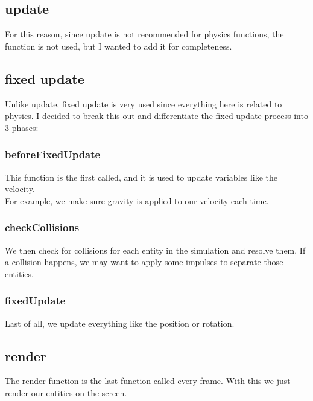 \documentclass{article}
\begin{document}
    \subsection{update}\label{subsec:update}

    For this reason, since update is not recommended for physics functions, the function is not used, but I wanted to add it for completeness.

    \subsection{fixed update}\label{subsec:fixed-update}

    Unlike update, fixed update is very used since everything here is related to physics.
    I decided to break this out and differentiate the fixed update process into 3 phases:

    \subsubsection{beforeFixedUpdate}

    This function is the first called, and it is used to update variables like the velocity.\\
    For example, we make sure gravity is applied to our velocity each time.

    \subsubsection{checkCollisions}

    We then check for collisions for each entity in the simulation and resolve them.
    If a collision happens, we may want to apply some impulses to separate those entities.

    \subsubsection{fixedUpdate}

    Last of all, we update everything like the position or rotation.

    \subsection{render}\label{subsec:render}

    The render function is the last function called every frame.
    With this we just render our entities on the screen.
\end{document}
